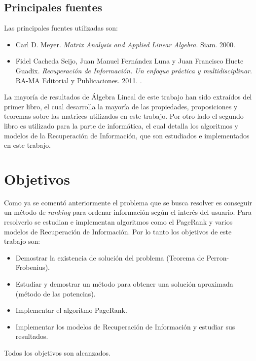 \documentclass[size=a4, parskip=half, titlepage=false, toc=flat, toc=bib, 12pt, twoside]{scrartcl}
\theoremstyle{theorem-style}
\theoremstyle{definition-style}
\theoremstyle{remark-style}
\theoremstyle{example-style}
\theoremstyle{definition-style}
\theoremstyle{remark-style}
\begin{document}
\newpage

\subsection{Principales fuentes}
Las principales fuentes utilizadas son:
\begin{itemize}
\item  Carl D. Meyer.
\textit{Matrix Analysis and Applied Linear Algebra}. Siam. 2000. \cite{algebralineal}
\item Fidel Cacheda Seijo, Juan Manuel Fernández Luna y Juan Francisco Huete Guadix.
\textit{Recuperación de Información. Un enfoque práctica y multidisciplinar}. RA-MA Editorial y Publicaciones. 2011. \cite{ri}.
\end{itemize}

La mayoría de resultados de Álgebra Lineal de este trabajo han sido extraídos del primer libro, el cual desarrolla la mayoría de las propiedades, proposiciones y teoremas sobre las matrices utilizados en este trabajo. Por otro lado el segundo libro es utilizado para la parte de informática, el cual detalla los algoritmos y modelos de la Recuperación de Información, que son  estudiados e implementados en este trabajo.

\newpage

\section{Objetivos}
Como ya se comentó anteriormente el problema que se busca resolver es conseguir un método de \textit{ranking} para ordenar información según el interés del usuario. Para resolverlo se estudian e implementan algoritmos como el PageRank y varios modelos de Recuperación de Información. Por lo tanto los objetivos de este trabajo son:
\begin{itemize}
\item Demostrar la existencia de solución del problema (Teorema de Perron-Frobenius).
\item Estudiar y demostrar un método para obtener una solución aproximada (método de las potencias).
\item Implementar el algoritmo PageRank.
\item Implementar los modelos de Recuperación de Información y estudiar sus resultados.
\end{itemize}

Todos los objetivos son alcanzados.
\newpage
\end{document}
